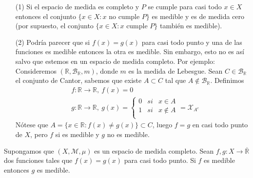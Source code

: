 \begin{obs}
\begin{enumerate}
    \item[(1)] Si el espacio de medida es completo y $P$ se cumple para casi todo $x \in X$ entonces el conjunto $\{ x \in X : x \text{ no cumple } P \}$ es medible y es de medida cero (por supuesto, el conjunto $\{ x \in X : x \text{ cumple } P \}$ también es medible).
    \item[(2)] Podría parecer que si $f(x) = g(x)$ para casi todo punto y una de las funciones es medible entonces la otra es medible. Sin embargo, esto no es así salvo que estemos en un espacio de medida completo. Por ejemplo:
    \\
    \newline
    Consideremos $(\mathbb{R}, \mathcal{B}_{\mathbb{R}}, m)$, donde $m$ es la medida de Lebesgue. Sean $C \in \mathcal{B}_{\mathbb{R}}$ el conjunto de Cantor, sabemos que existe $A \subset C$ tal que $A \not \in \mathcal{B}_{\mathbb{R}}$. Definimos
    \begin{align*}
        &f: \mathbb{R} \longrightarrow \mathbb{R}, \ f(x) = 0\\
        &g: \mathbb{R} \longrightarrow \mathbb{R}, \ g(x) = \left\{ \begin{array}{lcc}
             0 &  si  &x \in A\\
             1 &  si  &x \not \in  A \\
             \end{array}
   \right.
   = \mathcal{X}_{A^c}
    \end{align*}
    Nótese que $A = \{ x \in \mathbb{R} : f(x) \not = g(x)\} \subset C$, luego $f = g$ en casi todo punto de $X$, pero $f$ si es medible y $g$ no es medible.
\end{enumerate}
\end{obs}
\begin{prop}
Supongamos que $(X, \mathcal{M}, \mu)$ es un espacio de medida completo. Sean $f,g: X \longrightarrow \overline{\mathbb{R}}$ dos funciones tales que $f(x) = g(x)$ para casi todo punto. Si $f$ es medible entonces $g$ es medible.
\end{prop}

